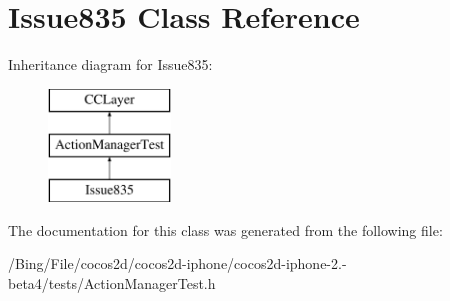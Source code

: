 \hypertarget{interface_issue835}{\section{Issue835 Class Reference}
\label{interface_issue835}
}
Inheritance diagram for Issue835\-:\begin{figure}[H]
\begin{center}
\leavevmode
\includegraphics[height=3.000000cm]{interface_issue835}
\end{center}
\end{figure}


The documentation for this class was generated from the following file\-:\begin{DoxyCompactItemize}
\item 
/\-Bing/\-File/cocos2d/cocos2d-\/iphone/cocos2d-\/iphone-\/2.-\/beta4/tests/Action\-Manager\-Test.\-h\end{DoxyCompactItemize}
